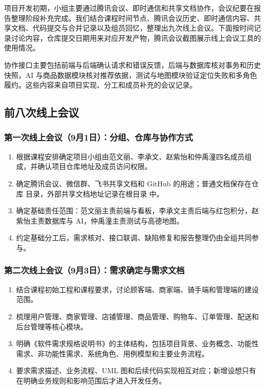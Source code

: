 项目开发初期，小组主要通过腾讯会议、即时通信和共享文档协作，会议纪要在报告整理阶段补充完成。我们结合课程时间节点、腾讯会议历史、即时通信内容、共享文档、代码提交与合并记录以及组员回忆，整理出九次线上会议。下面按时间记录讨论内容，仓库提交日期用来对应开发产物，腾讯会议截图展示线上会议工具的使用情况。

协作接口主要包括前端与后端确认请求和错误反馈，后端与数据库核对事务和历史快照，AI 与商品数据模块核对推荐依据，测试与地图模块验证定位失败和多角色履约。这些内容来自项目实现、分工和成员补充的会议记录。

\subsection{前八次线上会议}
\subsubsection{第一次线上会议（9月1日）：分组、仓库与协作方式}
\begin{enumerate}
  \item 根据课程安排确定项目小组由范文丽、李承文、赵紫怡和仲禹潼四名成员组成，并确认项目仓库地址及成员访问权限。
  \item 确定腾讯会议、微信群、飞书共享文档和 GitHub 的用途；普通文档保存在仓库  目录，外部共享文档地址记录在根目录  中。
  \item 确定基础责任范围：范文丽主责前端与看板，李承文主责后端与红包积分，赵紫怡主责数据库与 AI，仲禹潼主责测试与高德地图。
  \item 约定基础分工后，需求核对、接口联调、缺陷修复和报告整理仍由全组共同参与。
\end{enumerate}

\subsubsection{第二次线上会议（9月3日）：需求确定与需求文档}
\begin{enumerate}
  \item 结合课程初始工程和课程要求，讨论顾客端、商家端、骑手端和管理端的建设范围。
  \item 梳理用户管理、商家管理、店铺管理、商品管理、购物车、订单管理、配送和后台管理等核心模块。
  \item 明确《软件需求规格说明书》的主体结构，包括项目背景、业务概念、功能性需求、非功能性需求、系统角色、用例模型和主要业务流程。
  \item 要求需求描述、业务流程、UML 图和后续代码实现相互对应；新增设想只有在明确业务规则和影响范围后才进入开发任务。
\end{enumerate}


